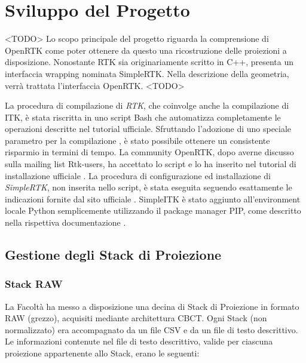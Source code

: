 \documentclass[a4paper,12pt, doubleside]{report}
\begin{document}
                                              
    \chapter{Sviluppo del Progetto}
        \par
            <TODO>
            Lo scopo principale del progetto riguarda la comprensione di OpenRTK come poter ottenere da questo una ricostruzione delle proiezioni a disposizione.
            Nonostante RTK sia originariamente scritto in C++, presenta un interfaccia wrapping nominata SimpleRTK. Nella descrizione della geometria, verrà trattata l'interfaccia OpenRTK. <TODO>
        
        \bigskip
        \par
            La procedura di compilazione di \textit{RTK}, che coinvolge anche la compilazione di ITK, è stata riscritta in uno script Bash \cite{script-bash} che automatizza completamente le operazioni descritte nel tutorial ufficiale. Sfruttando l'adozione di uno speciale parametro per la compilazione \cite{parallel-j}, è stato possibile ottenere un consistente risparmio in termini di tempo. La community OpenRTK, dopo averne discusso sulla mailing list Rtk-users, ha accettato lo script e lo ha inserito nel tutorial di installazione ufficiale \cite{wiki-rtk}. La procedura di configurazione ed installazione di \textit{SimpleRTK}, non inserita nello script, è stata eseguita seguendo esattamente le indicazioni fornite dal sito ufficiale \cite{simplertk-install}. SimpleITK è stato aggiunto all'environment locale Python semplicemente utilizzando il package manager PIP, come descritto nella rispettiva documentazione \cite{simpleitk-install}.    


        \section{Gestione degli Stack di Proiezione}
            \subsection{Stack RAW}
                \par
                    La Facoltà ha messo a disposizione una decina di Stack di Proiezione in formato RAW (grezzo), acquisiti mediante architettura CBCT. Ogni Stack (non normalizzato) era accompagnato da un file CSV e da un file di testo descrittivo. Le informazioni contenute nel file di testo descrittivo, valide per ciascuna proiezione appartenente allo Stack, erano le seguenti:
                    
\end{document}
